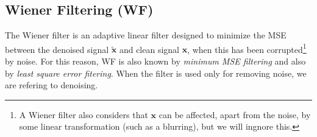 \documentclass{article}
\begin{document}

\subsection{Wiener Filtering (WF)}
The Wiener filter \cite{wiener1942extrapolation} is an adaptive linear
filter designed to minimize the MSE between the denoised signal
$\tilde{\mathbf{x}}$ and clean signal $\mathbf{x}$, when this has been
corrupted\footnote{A Wiener filter also considers that $\mathbf{x}$
  can be affected, apart from the noise, by some linear transformation
  (such as a blurring), but we will ingnore this.} by noise. For this
reason, WF is also known by \emph{minimum MSE filtering} and also by
\emph{least square error fitering}. When the filter is used only for
removing noise, we are refering to denoising.
\end{document}
